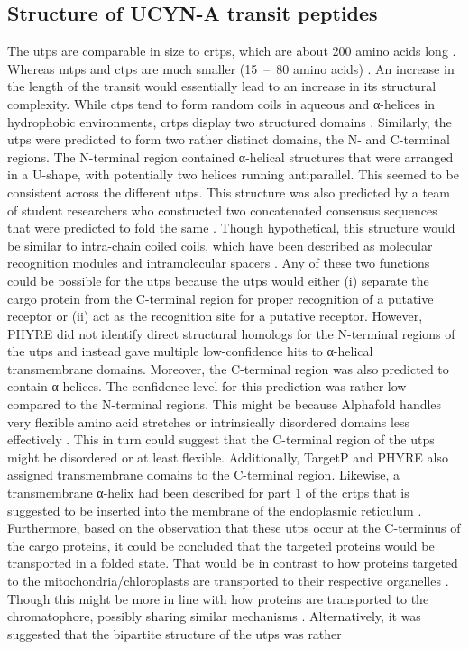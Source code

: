 \subsection{Structure of UCYN-A transit peptides}
The \gls{utp}s are comparable in size to \gls{crtps}, which are about 200 amino acids long \parencite{singer_massive_2017}. Whereas \gls{mtps} and \gls{ctps} are much smaller (15~--~80 amino acids) \parencite{garg_role_2016, von_heinje_chloroplast_1991}. An increase in the length of the transit would essentially lead to an increase in its structural complexity. While \gls{ctps} tend to form random coils in aqueous and α-helices in hydrophobic environments, \gls{crtps} display two structured domains \parencite{oberleitner_bipartite_2022, klimenko_paulinella_2025, bruce_chloroplast_2000}. Similarly, the \gls{utp}s were predicted to form two rather distinct domains, the N- and C-terminal regions. The N-terminal region contained α-helical structures that were arranged in a U-shape, with potentially two helices running antiparallel. This seemed to be consistent across the different \gls{utp}s. This structure was also predicted by a team of student researchers who constructed two concatenated consensus sequences that were predicted to fold the same \parencite{purrinos_nitroblast_2024}. Though hypothetical, this structure would be similar to intra-chain coiled coils, which have been described as molecular recognition modules and intramolecular spacers \parencite{hartmann_functional_2017}. Any of these two functions could be possible for the \gls{utp}s because the \gls{utp}s would either (i) separate the cargo protein from the C-terminal region for proper recognition of a putative receptor or (ii) act as the recognition site for a putative receptor. However, PHYRE did not identify direct structural homologs for the N-terminal regions of the \gls{utp}s and instead gave multiple low-confidence hits to α-helical transmembrane domains. Moreover, the C-terminal region was also predicted to contain α-helices. The confidence level for this prediction was rather low compared to the N-terminal regions. This might be because Alphafold handles very flexible amino acid stretches or intrinsically disordered domains less effectively \parencite{ruff_alphafold_2021}. This in turn could suggest that the C-terminal region of the \gls{utp}s might be disordered or at least flexible. Additionally, TargetP and PHYRE also assigned transmembrane domains to the C-terminal region. Likewise, a transmembrane α-helix had been described for part 1 of the \gls{crtps} that is suggested to be inserted into the membrane of the endoplasmic reticulum \parencite{singer_massive_2017}. Furthermore, based on the observation that these \gls{utp}s occur at the C-terminus of the cargo proteins, it could be concluded that the targeted proteins would be transported in a folded state. That would be in contrast to how proteins targeted to the mitochondria/chloroplasts are transported to their respective organelles \parencite{schleiff_common_2011}. Though this might be more in line with how proteins are transported to the chromatophore, possibly sharing similar mechanisms \parencite{oberleitner_bipartite_2022, singer_massive_2017}. Alternatively, it was suggested that the bipartite structure of the \gls{utp}s was rather 